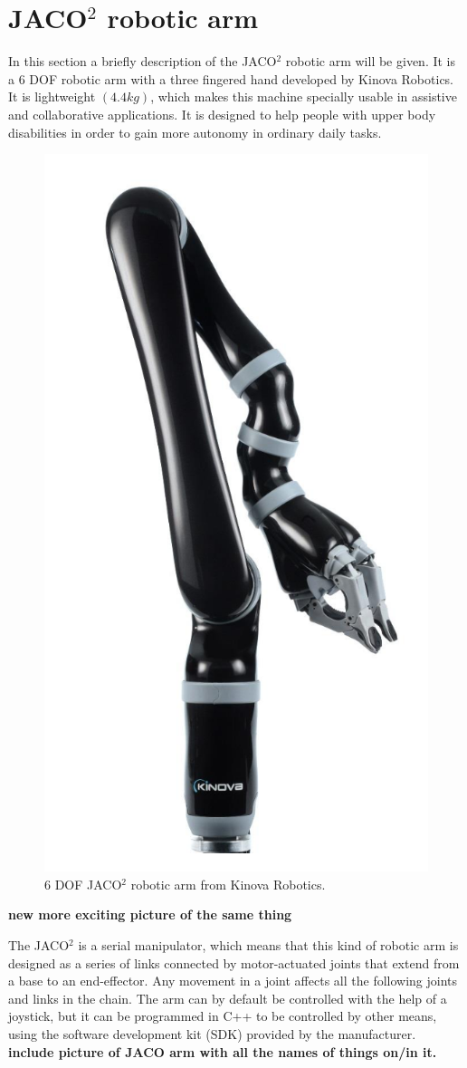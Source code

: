\section{JACO$^2$ robotic arm}

In this section a briefly description of the JACO$^2$ robotic arm will be given. It is a 6 DOF robotic arm  with a three fingered hand developed by Kinova Robotics. It is lightweight $\left( 4.4 kg\right)$, which makes this machine specially usable in assistive and collaborative applications. It is designed to help people with upper body disabilities in order to gain more autonomy in ordinary daily tasks.\\

\begin{figure}[H]                    
\includegraphics[width=.3\textwidth]{figures/Jaco/roboticarm}  %
\caption{6 DOF JACO$^2$ robotic arm from Kinova Robotics. \cite{kinova webpage}}
\label{fig:roboticarm}  %
\end{figure}
\textbf{new more exciting picture of the same thing}

The JACO$^2$ is a serial manipulator, which means that this kind of robotic arm is designed as a series of links connected by motor-actuated joints that extend from a base to an end-effector. Any movement in a joint affects all the following joints and links in the chain. The arm can by default be controlled with the help of a joystick, but it can be programmed in C++ to be controlled by other means, using the software development kit (SDK) provided by the manufacturer.\\

\textbf{include picture of JACO arm with all the names of things on/in it.}


